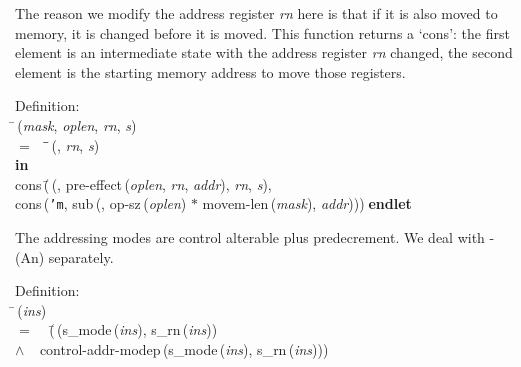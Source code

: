  The reason we modify the address register {\it{rn\/}} here is that if it is also moved to memory, it
 is changed before it is moved.  This function returns a `cons':  the
 first element is an intermediate state with the address register {\it{rn\/}} changed, the second
 element is the starting memory address to move those registers.
\begin{tabbing}{\sc Definition}: \\  
\=\,({\it{mask\/}}, {\it{oplen\/}}, {\it{rn\/}}, {\it{s\/}}) \\ 
$=$$\;\;\;\;$\=\=\,({}, {\it{rn\/}}, {\it{s\/}})\- \\ 
{\bf in} \\ 
{\rm{cons}}\,(\=\,({}, {\rm{pre-effect}}\,({\it{oplen\/}}, {\it{rn\/}}, {\it{addr\/}}), {\it{rn\/}}, {\it{s\/}}), \\ 
{\rm{cons}}\,({\tt{'}}{\tt{m}}, {\rm{sub}}\,({}, {\rm{op-sz}}\,({\it{oplen\/}}) $*$ {\rm{movem-len}}\,({\it{mask\/}}), {\it{addr\/}})))\-$\;${\bf  endlet}\-\-
\end{tabbing}

 The addressing modes are control alterable plus predecrement.  We
 deal with -(An) separately.
\begin{tabbing}{\sc Definition}: \\  
\=\,({\it{ins\/}}) \\ 
$=$$\;\;\;\;$(\=\,({\rm{s\_mode}}\,({\it{ins\/}}), {\rm{s\_rn}}\,({\it{ins\/}})) \\ 
$\wedge$$\;\;\;\;${\rm{control-addr-modep}}\,({\rm{s\_mode}}\,({\it{ins\/}}), {\rm{s\_rn}}\,({\it{ins\/}})))\-\-
\end{tabbing}

